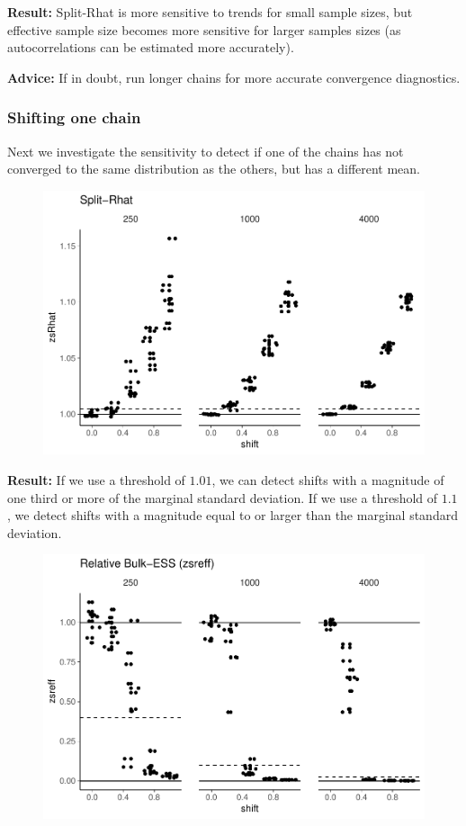 \documentclass[american,]{article}
\begin{document}
\textbf{Result:} Split-Rhat is more sensitive to trends for small sample
sizes, but effective sample size becomes more sensitive for larger
samples sizes (as autocorrelations can be estimated more accurately).

\textbf{Advice:} If in doubt, run longer chains for more accurate
convergence diagnostics.

\hypertarget{shifting-one-chain}{%
\subsubsection*{Shifting one chain}\label{shifting-one-chain}}

Next we investigate the sensitivity to detect if one of the chains has
not converged to the same distribution as the others, but has a
different mean.

\begin{figure}[tp]
  \centering
  \includegraphics[width=0.6\linewidth]{graphics/zsrhat-shifted-chain-1.pdf}
\end{figure}

\textbf{Result:} If we use a threshold of \(1.01\), we can detect shifts
with a magnitude of one third or more of the marginal standard
deviation. If we use a threshold of \(1.1\), we detect shifts with a
magnitude equal to or larger than the marginal standard deviation.

\begin{figure}[tp]
  \centering
  \includegraphics[width=0.6\linewidth]{graphics/zsreff-shifted-chain-1.pdf}
\end{figure}
\end{document}
